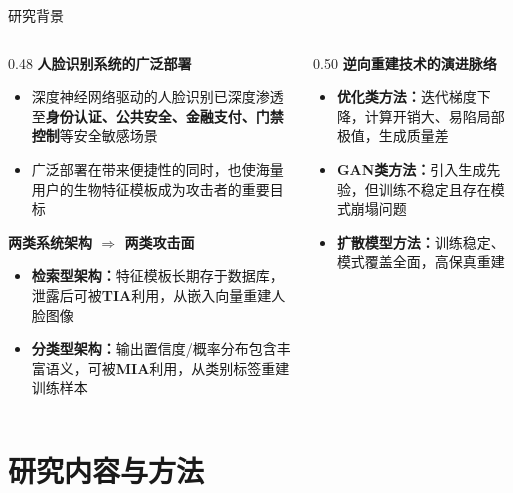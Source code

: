 \documentclass[aspectratio=169,12pt]{beamer}
\renewcommand{\textbf}[1]{\textcolor{hitblue}{\bfseries #1}}
\newcommand{\important}[1]{\textcolor{hitgray}{\textbf{#1}}}
\begin{document}
\begin{frame}{研究背景}
\footnotesize
\begin{columns}[c]
\begin{column}{0.48\textwidth}
\textbf{人脸识别系统的广泛部署}
\begin{itemize}\setlength{\itemsep}{1pt}
  \item 深度神经网络驱动的人脸识别已深度渗透至\important{身份认证、公共安全、金融支付、门禁控制}等安全敏感场景
  \item 广泛部署在带来便捷性的同时，也使海量用户的生物特征模板成为攻击者的重要目标
\end{itemize}

\vspace{2pt}
\textbf{两类系统架构 $\Rightarrow$ 两类攻击面}

\begin{itemize}\setlength{\itemsep}{1pt}
  \item \important{检索型架构：}特征模板长期存于数据库，泄露后可被\textbf{TIA}利用，从嵌入向量重建人脸图像
  \item \important{分类型架构：}输出置信度/概率分布包含丰富语义，可被\textbf{MIA}利用，从类别标签重建训练样本
\end{itemize}
\end{column}

\begin{column}{0.50\textwidth}
\textbf{逆向重建技术的演进脉络}

\begin{itemize}\setlength{\itemsep}{1pt}
  \item \important{优化类方法：}迭代梯度下降，计算开销大、易陷局部极值，生成质量差
  \item \important{GAN类方法：}引入生成先验，但训练不稳定且存在模式崩塌问题
  \item \important{扩散模型方法：}训练稳定、模式覆盖全面，高保真重建
\end{itemize}

\end{column}
\end{columns}
\end{frame} %

\section{研究内容与方法}
\end{document}
